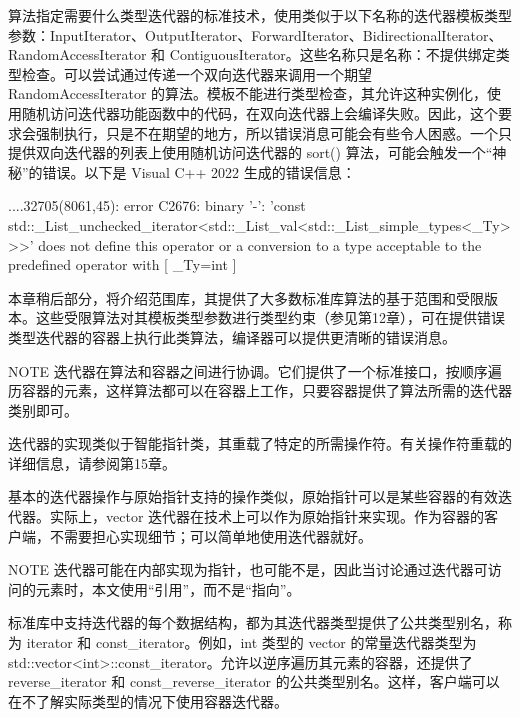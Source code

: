 
算法指定需要什么类型迭代器的标准技术，使用类似于以下名称的迭代器模板类型参数：InputIterator、OutputIterator、ForwardIterator、BidirectionalIterator、RandomAccessIterator 和 ContiguousIterator。这些名称只是名称：不提供绑定类型检查。可以尝试通过传递一个双向迭代器来调用一个期望 RandomAccessIterator 的算法。模板不能进行类型检查，其允许这种实例化，使用随机访问迭代器功能函数中的代码，在双向迭代器上会编译失败。因此，这个要求会强制执行，只是不在期望的地方，所以错误消息可能会有些令人困惑。一个只提供双向迭代器的列表上使用随机访问迭代器的 sort() 算法，可能会触发一个“神秘”的错误。以下是 Visual C++ 2022 生成的错误信息：

\begin{shell}
...\MSVC{}.32705\algorithm(8061,45): error C2676: binary '-': 'const
std::_List_unchecked_iterator<std::_List_val<std::_List_simple_types<_Ty>>>' does
not define this operator or a conversion to a type acceptable to the
predefined operator
    with
    [
      _Ty=int
    ]
\end{shell}

本章稍后部分，将介绍范围库，其提供了大多数标准库算法的基于范围和受限版本。这些受限算法对其模板类型参数进行类型约束（参见第12章），可在提供错误类型迭代器的容器上执行此类算法，编译器可以提供更清晰的错误消息。

\begin{myNotic}{NOTE}
迭代器在算法和容器之间进行协调。它们提供了一个标准接口，按顺序遍历容器的元素，这样算法都可以在容器上工作，只要容器提供了算法所需的迭代器类别即可。
\end{myNotic}

迭代器的实现类似于智能指针类，其重载了特定的所需操作符。有关操作符重载的详细信息，请参阅第15章。

基本的迭代器操作与原始指针支持的操作类似，原始指针可以是某些容器的有效迭代器。实际上，vector 迭代器在技术上可以作为原始指针来实现。作为容器的客户端，不需要担心实现细节；可以简单地使用迭代器就好。

\begin{myNotic}{NOTE}
迭代器可能在内部实现为指针，也可能不是，因此当讨论通过迭代器可访问的元素时，本文使用“引用”，而不是“指向”。
\end{myNotic}


标准库中支持迭代器的每个数据结构，都为其迭代器类型提供了公共类型别名，称为 iterator 和 const\_iterator。例如，int 类型的 vector 的常量迭代器类型为 std::vector<int>::const\_iterator。允许以逆序遍历其元素的容器，还提供了 reverse\_iterator 和 const\_reverse\_iterator 的公共类型别名。这样，客户端可以在不了解实际类型的情况下使用容器迭代器。

